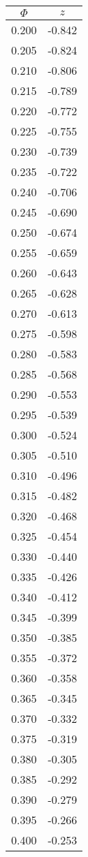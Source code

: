 \begin{tabular}{|c|c|}\hline
$\Phi$ & $z$ \\ \hline
0.200 & -0.842\\
0.205 & -0.824\\
0.210 & -0.806\\
0.215 & -0.789\\
0.220 & -0.772\\
0.225 & -0.755\\
0.230 & -0.739\\
0.235 & -0.722\\
0.240 & -0.706\\
0.245 & -0.690\\
0.250 & -0.674\\
0.255 & -0.659\\
0.260 & -0.643\\
0.265 & -0.628\\
0.270 & -0.613\\
0.275 & -0.598\\
0.280 & -0.583\\
0.285 & -0.568\\
0.290 & -0.553\\
0.295 & -0.539\\
0.300 & -0.524\\
0.305 & -0.510\\
0.310 & -0.496\\
0.315 & -0.482\\
0.320 & -0.468\\
0.325 & -0.454\\
0.330 & -0.440\\
0.335 & -0.426\\
0.340 & -0.412\\
0.345 & -0.399\\
0.350 & -0.385\\
0.355 & -0.372\\
0.360 & -0.358\\
0.365 & -0.345\\
0.370 & -0.332\\
0.375 & -0.319\\
0.380 & -0.305\\
0.385 & -0.292\\
0.390 & -0.279\\
0.395 & -0.266\\
0.400 & -0.253\\
\hline \end{tabular}

\columnbreak

